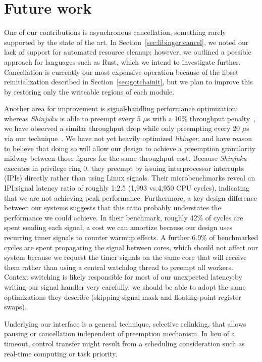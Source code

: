 \section{Future work}

One of our contributions is asynchronous cancellation, something rarely supported by
the state of the art.  In Section~\ref{sec:libinger:cancel}, we noted our lack of
support for automated resource cleanup; however, we outlined a possible approach for
languages such as Rust, which we intend to investigate further.  Cancellation is
currently
our most expensive operation because of the libset reinitialization described in
Section~\ref{sec:gotchainit}, but we plan to improve this by restoring only the
writeable regions of each module.

Another area for improvement is signal-handling performance optimization: whereas
\textit{Shinjuku} is able to preempt every 5 $\mu$s with a 10\% throughput
penalty~\cite{Kaffes:nsdi2019}, we have observed a similar throughput drop while only
preempting every 20 $\mu$s via our technique~\cite{boucher:atc2018}.  We have not yet
heavily optimized \textit{libinger}, and have reason to believe that doing so will
allow our design to achieve a preemption granularity midway between those figures
for the same throughput cost.  Because \textit{Shinjuku} executes in privilege ring
0, they preempt by issuing interprocessor interrupts (IPIs) directly rather than
using Linux signals.  Their microbenchmarks reveal an IPI:signal latency ratio of
roughly 1:2.5 (1,993 vs.\@ 4,950 CPU cycles), indicating that we are not achieving
peak performance.  Furthermore, a key design difference between our systems suggests
that this ratio probably understates the performance we could achieve.  In their
benchmark, roughly 42\% of cycles are spent sending each signal, a cost we can
amortize because our design uses recurring timer signals to counter warmup effects.
A further 6.9\% of benchmarked cycles are spent propagating the signal between cores,
which should not affect our system because we request the timer signals on the same
core that will receive them rather than using a central watchdog thread to preempt
all workers.  Context switching is likely responsible for most of our unexpected
latency:\@ by writing our signal handler very carefully, we should be able to adopt
the same optimizations they describe (skipping signal mask and floating-point
register swaps).

Underlying our interface is a general technique, selective relinking, that allows
pausing or cancellation independent of preemption mechanism.  In lieu of a timeout,
control transfer might result from a scheduling consideration such as real-time
computing or task priority.

